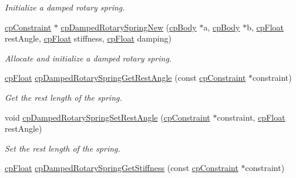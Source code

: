 \begin{DoxyCompactItemize}
\begin{DoxyCompactList}\small\item\em Initialize a damped rotary spring. \end{DoxyCompactList}\item 
\hypertarget{group__cp_damped_rotary_spring_ga40e595bc6e077304ad3857c80118c5a4}{}\hyperlink{structcp_constraint}{cp\+Constraint} $\ast$ \hyperlink{group__cp_damped_rotary_spring_ga40e595bc6e077304ad3857c80118c5a4}{cp\+Damped\+Rotary\+Spring\+New} (\hyperlink{structcp_body}{cp\+Body} $\ast$a, \hyperlink{structcp_body}{cp\+Body} $\ast$b, \hyperlink{group__basic_types_gac1ed65573e035bf892505768c852d8d3}{cp\+Float} rest\+Angle, \hyperlink{group__basic_types_gac1ed65573e035bf892505768c852d8d3}{cp\+Float} stiffness, \hyperlink{group__basic_types_gac1ed65573e035bf892505768c852d8d3}{cp\+Float} damping)\label{group__cp_damped_rotary_spring_ga40e595bc6e077304ad3857c80118c5a4}

\begin{DoxyCompactList}\small\item\em Allocate and initialize a damped rotary spring. \end{DoxyCompactList}\item 
\hypertarget{group__cp_damped_rotary_spring_gaafc4c1b1c85433703302b151c5e63342}{}\hyperlink{group__basic_types_gac1ed65573e035bf892505768c852d8d3}{cp\+Float} \hyperlink{group__cp_damped_rotary_spring_gaafc4c1b1c85433703302b151c5e63342}{cp\+Damped\+Rotary\+Spring\+Get\+Rest\+Angle} (const \hyperlink{structcp_constraint}{cp\+Constraint} $\ast$constraint)\label{group__cp_damped_rotary_spring_gaafc4c1b1c85433703302b151c5e63342}

\begin{DoxyCompactList}\small\item\em Get the rest length of the spring. \end{DoxyCompactList}\item 
\hypertarget{group__cp_damped_rotary_spring_gaaca8dee081e56214fb6b9bd14cdad6ca}{}void \hyperlink{group__cp_damped_rotary_spring_gaaca8dee081e56214fb6b9bd14cdad6ca}{cp\+Damped\+Rotary\+Spring\+Set\+Rest\+Angle} (\hyperlink{structcp_constraint}{cp\+Constraint} $\ast$constraint, \hyperlink{group__basic_types_gac1ed65573e035bf892505768c852d8d3}{cp\+Float} rest\+Angle)\label{group__cp_damped_rotary_spring_gaaca8dee081e56214fb6b9bd14cdad6ca}

\begin{DoxyCompactList}\small\item\em Set the rest length of the spring. \end{DoxyCompactList}\item 
\hypertarget{group__cp_damped_rotary_spring_gaf98cd8255fcee83c994f4e7ca685a7a6}{}\hyperlink{group__basic_types_gac1ed65573e035bf892505768c852d8d3}{cp\+Float} \hyperlink{group__cp_damped_rotary_spring_gaf98cd8255fcee83c994f4e7ca685a7a6}{cp\+Damped\+Rotary\+Spring\+Get\+Stiffness} (const \hyperlink{structcp_constraint}{cp\+Constraint} $\ast$constraint)\label{group__cp_damped_rotary_spring_gaf98cd8255fcee83c994f4e7ca685a7a6}


\end{DoxyCompactItemize}
